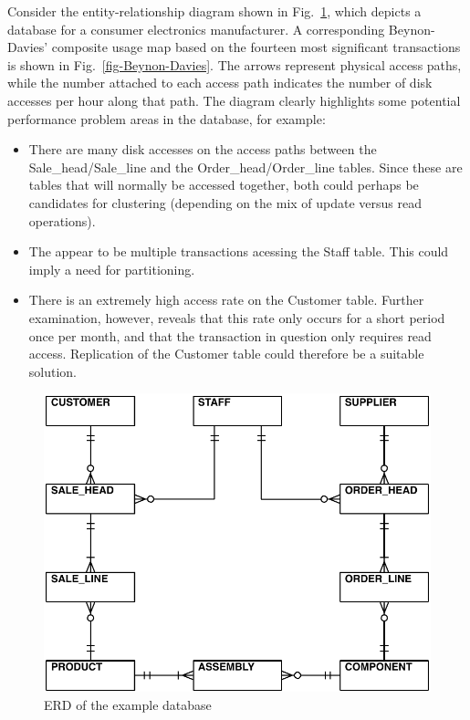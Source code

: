 \documentclass{llncs}
\begin{document}
Consider the entity-relationship diagram shown in Fig.~\ref{fig-ERD},
which depicts a database for a consumer electronics manufacturer. A
corresponding Beynon-Davies' composite usage map based on the fourteen
most significant transactions is shown in Fig.~\ref{fig-Beynon-Davies}.
The arrows represent physical access paths, while the number attached to
each access path indicates the number of disk accesses per hour along
that path. The diagram clearly highlights some potential performance
problem areas in the database, for example:
\begin{itemize}

	\item There are many disk accesses on the access paths between the
	Sale\_head/Sale\_line and the Order\_head/Order\_line tables. Since
	these are tables that will normally be accessed together, both could
	perhaps be candidates for clustering (depending on the mix of update
	versus read operations).

	\item The appear to be multiple transactions acessing the Staff
	table. This could imply a need for partitioning.
	
	\item There is an extremely high access rate on the Customer table.
	Further examination, however, reveals that this rate only occurs for
	a short period once per month, and that the transaction in question
	only requires read access. Replication of the Customer table could
	therefore be a suitable solution.
	
\end{itemize}

\begin{figure}
	\includegraphics[width=\columnwidth,keepaspectratio]{ERD}
	\caption{ERD of the example database}
	\label{fig-ERD}
\end{figure}
\end{document}
